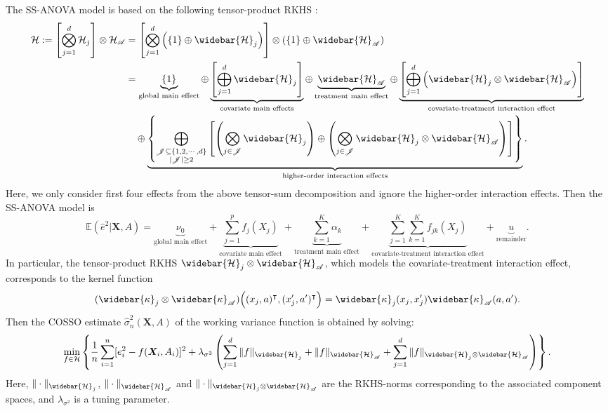 \documentclass[11pt]{article}
\numberwithin{equation}{section}
\theoremstyle{definition}
\theoremstyle{remark}
\newcommand{\bX}{\bm{X}}
\newcommand{\bbE}{\mathbb{E}}
\newcommand{\cH}{\mathcal{H}}
\newcommand{\sA}{\mathscr{A}}
\newcommand{\sJ}{\mathscr{J}}
\begin{document}
The SS-ANOVA model is based on the following tensor-product RKHS \citep[Section 2.4.1]{gu2013smoothing}:
\begin{align*}
	\cH := \left[ \bigotimes_{j=1}^{d}\cH_{j} \right] \otimes \cH_{\sA} &= \left[ \bigotimes_{j=1}^{d}\left( \{1\} \oplus \widebar{\cH}_{j}\right) \right] \otimes \left(\{1\} \oplus \widebar{\cH}_{\sA} \right) \\
	&= \underbrace{\{1\}}_{\text{global main effect}} \oplus \underbrace{\left[ \bigoplus_{j=1}^{d}\widebar{\cH}_{j} \right]}_{\text{covariate main effects}} \oplus \underbrace{\widebar{\cH}_{\sA}}_{\text{treatment main effect}} \oplus \underbrace{\left[ \bigoplus_{j=1}^{d}\left(\widebar{\cH}_{j}\otimes \widebar{\cH}_{\sA}\right) \right]}_{\text{covariate-treatment interaction effect}}\\
	&\quad \oplus \underbrace{\left\{ \bigoplus_{\substack{\sJ \subseteq \{1,2,\cdots,d\} \\ |\sJ| \ge 2}} \left[ \left( \bigotimes_{j \in \sJ}\widebar{\cH}_{j} \right) \oplus \left( \bigotimes_{j\in \sJ}\widebar{\cH}_{j}\otimes\widebar{\cH}_{\sA} \right) \right] \right\}}_{\text{higher-order interaction effects}}.
\end{align*}
Here, we only consider first four effects from the above tensor-sum decomposition and ignore the higher-order interaction effects. Then the SS-ANOVA model is
\[ \bbE(\widehat{e}^{2}|\bX,A) = \underbrace{\nu_{0}}_{\text{global main effect}} + \underbrace{\sum_{j=1}^{p}f_{j}(X_{j})}_{\text{covariate main effect}} + \underbrace{\sum_{k=1}^{K}\alpha_{k}}_{\text{treatment main effect}} + \underbrace{\sum_{j=1}^{K}\sum_{k=1}^{K}f_{jk}(X_{j})}_{\text{covariate-treatment interaction effect}} + \underbrace{u}_{\text{remainder}}. \]
In particular, the tensor-product RKHS $ \widebar{\cH}_{j} \otimes \widebar{\cH}_{\sA} $, which models the covariate-treatment interaction effect, corresponds to the kernel function 
\[ (\widebar{\kappa}_{j} \otimes \widebar{\kappa}_{\sA})\Big( (x_{j},a)^{\intercal},(x_{j}',a')^{\intercal} \Big) = \widebar{\kappa}_{j}(x_{j},x_{j}')\widebar{\kappa}_{\sA}(a,a'). \]
Then the COSSO estimate $ \widehat{\sigma}_{n}^{2}(\bX,A) $ of the working variance function is obtained by solving:
\[ \min_{f \in \cH}\left\{ {1 \over n}\sum_{i=1}^{n}[e_{i}^{2} - f(\bX_{i},A_{i})]^{2} + \lambda_{\sigma^{2}}\left( \sum_{j=1}^{d}\| f \|_{\widebar{\cH}_{j}} + \| f \|_{\widebar{\cH}_{\sA}} + \sum_{j=1}^{d}\| f \|_{\widebar{\cH}_{j}\otimes \widebar{\cH}_{\sA}} \right) \right\}. \]
Here, $ \| \cdot \|_{\widebar{\cH}_{j}} $, $ \| \cdot \|_{\widebar{\cH}_{\sA}} $ and $ \| \cdot \|_{\widebar{\cH}_{j}\otimes\widebar{\cH}_{\sA}} $ are the RKHS-norms corresponding to the associated component spaces, and $ \lambda_{\sigma^{2}} $ is a tuning parameter.
\end{document}
